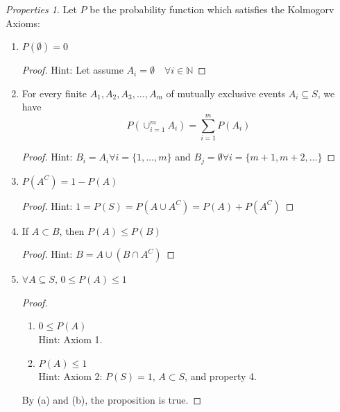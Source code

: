 \documentclass[twoside]{article}
\theoremstyle{definition}
\theoremstyle{remark}
\newtheorem{properties}{Properties}[definition]
\begin{document}
\begin{properties}
  Let $P$ be the probability function which satisfies the Kolmogorv Axioms:
  \begin{enumerate}
    \item $P(\emptyset) = 0$ \\
    \begin{proof}
      Hint: Let assume $A_i = \emptyset \quad \forall i \in \mathbb{N}$
    \end{proof}

    \item For every finite $A_1, A_2, A_3,\ldots, A_m$ of mutually exclusive
          events $A_i \subseteq S$, we have
          \begin{equation}
            P\left(\cup_{i=1}^{m} A_i\right) = \sum_{i=1}^{m} P(A_i)
          \end{equation}
          \begin{proof}
            Hint: $B_i = A_i \forall i = \{ 1,\ldots, m \}$ and $B_j = \emptyset \forall i = \{ m+1,m+2,\ldots \}$
          \end{proof}

    \item $P(A^C) =  1 - P(A)$ \\
    \begin{proof}
      Hint: $1 = P(S) = P(A \cup A^C) = P(A) + P(A^C)$
    \end{proof}

    \item If $A \subset B$, then $P(A) \leq P(B)$ \\
    \begin{proof}
      Hint: $B=A \cup (B \cap A^C)$
    \end{proof}

    \item $\forall A \subseteq S,\, 0 \leq P(A) \leq 1$ \\
    \begin{proof}
      \begin{enumerate}
        \item $0 \leq P(A)$ \\
        Hint: Axiom 1.
        \item $P(A) \leq 1$ \\
        Hint: Axiom 2: $P(S) = 1$, $A \subset S$, and property 4.
      \end{enumerate}
      By (a) and (b), the proposition is true.
    \end{proof}


\end{enumerate}
\end{properties}
\end{document}

